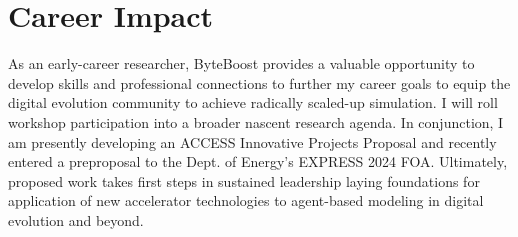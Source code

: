 \section{Career Impact}

As an early-career researcher, ByteBoost provides a valuable opportunity to develop skills and professional connections to further my career goals to equip the digital evolution community to achieve radically scaled-up simulation.
I will roll workshop participation into a broader nascent research agenda.
In conjunction, I am presently developing an ACCESS Innovative Projects Proposal and recently entered a preproposal to the Dept. of Energy's EXPRESS 2024 FOA.
Ultimately, proposed work takes first steps in sustained leadership laying foundations for application of new accelerator technologies to agent-based modeling in digital evolution and beyond.



